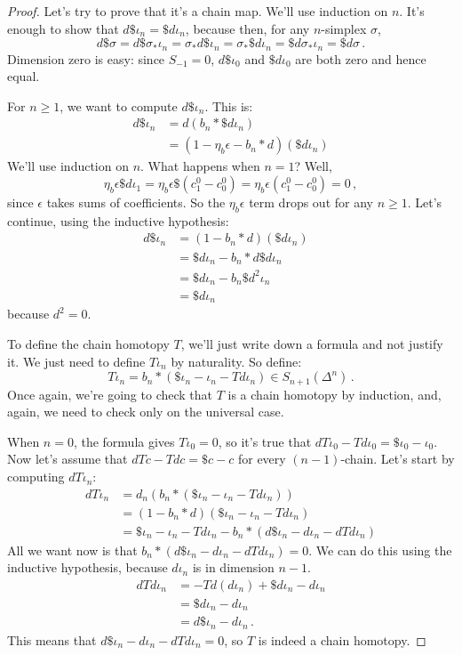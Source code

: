 \noindent
\begin{proof}
Let's try to prove that it's a chain map. We'll use induction on $n$. It's enough to show that $d\$\iota_n=\$ d\iota_n$, because then, for any $n$-simplex $\sigma$,
$$
d\$\sigma=d\$\sigma_\ast\iota_n=\sigma_\ast d\$\iota_n=\sigma_\ast \$d\iota_n=\$ d\sigma_\ast\iota_n=\$ d\sigma\,.
$$
Dimension zero is easy:
since $S_{-1}=0$, $d\$\iota_0$ and $\$d\iota_0$ are both zero and hence equal.

For $n\geq 1$, we want to compute $d\$\iota_n$. This is:
\begin{align*}
d\$\iota_n & =d(b_n\ast \$ d\iota_n)  \\
 & = (1-\eta_b\epsilon-b_n\ast d)(\$ d\iota_n)
\end{align*}
We'll use induction on $n$. What happens when $n=1$? Well,
$$
\eta_b\epsilon\$d\iota_1 = \eta_b\epsilon \$(c^0_1 - c^0_0)=\eta_b\epsilon(c^0_1 - c^0_0)=0\,,
$$
since $\epsilon$ takes sums of coefficients. So the $\eta_b\epsilon$ term drops out for any $n\geq1$. Let's continue, using the inductive hypothesis:
\begin{align*}
d\$\iota_n & = (1 - b_n\ast d)(\$ d\iota_n) \\
 & = \$d\iota_n - b_n\ast d\$ d\iota_n  \\
 & = \$d\iota_n - b_n\$d^2\iota_n &\\
 & = \$d\iota_n 
\end{align*}
because $d^2=0$. 

To define the chain homotopy $T$, we'll just write down a formula and not justify it. We just need to define $T\iota_n$ by naturality. So define:
\[
T\iota_n = b_n\ast(\$\iota_n - \iota_n - Td\iota_n)\in S_{n+1}(\Delta^n) \,.
\]
Once again, we're going to check that $T$ is a chain homotopy by induction, and, again, we need to check only on the universal case.

When $n=0$, the formula gives $T\iota_0=0$, so it's true that $dT\iota_0-Td\iota_0=\$\iota_0-\iota_0$.
Now let's assume that $dTc-Tdc=\$c-c$ for every $(n-1)$-chain. Let's start by computing $dT\iota_n$:
\begin{align*}
dT\iota_n & = d_n(b_n\ast(\$\iota_n - \iota_n - Td\iota_n)) \\
& = (1-b_n\ast d)(\$\iota_n - \iota_n - Td\iota_n) \\
& = \$\iota_n-\iota_n-Td\iota_n-b_n\ast (d\$\iota_n - d\iota_n - dTd\iota_n)
\end{align*}
All we want now is that $b_n\ast(d\$\iota_n - d\iota_n - dTd\iota_n)=0$. We can do this using the inductive hypothesis, because $d\iota_n$ is in dimension $n-1$.
\begin{align*}
dTd\iota_n & = -Td(d\iota_n)+\$ d\iota_n - d\iota_n\\
& = \$d\iota_n - d\iota_n\\
& = d\$\iota_n - d\iota_n\,.
\end{align*}
This means that $d\$\iota_n-d\iota_n - dTd\iota_n=0$, so $T$ is indeed a chain homotopy. 
\end{proof}
